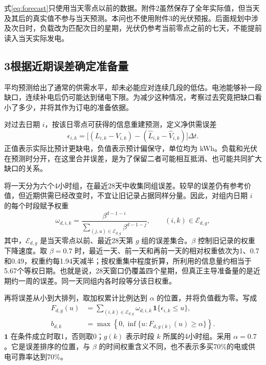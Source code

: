 \documentclass[11pt,a4paper]{article}
\begin{document}
式\eqref{eq:forecast}只使用当天零点以前的数据。附件2虽然保存了全年实际值，但当天及其后的真实值不参与当天预测。本问也不使用附件3的光伏预报。后面规划中涉及次日时，负载改为匹配次日的星期，光伏仍参考当前零点之前的七天，不能提前读入当天实际发电。

\subsection*{3\quad 根据近期误差确定准备量}

平均预测给出了通常的供需水平，却未必能应对连续几段的低估。电池能够补一段缺口，连续补电后仍可能达到储电下限。为减少这种情况，考察过去究竟把缺口看小了多少，并将其作为订电的准备依据。

对过去日期 $i$，按该日零点可获得的信息重建预测，定义净供需误差
\begin{equation}
\epsilon_{i,k}=\big[(L_{i,k}-V_{i,k})-(\widehat L_{i,k}-\widehat V_{i,k})\big]\Delta t.
\label{eq:error}
\end{equation}
正值表示实际比预计更缺电，负值表示预计偏保守，单位均为 kWh。负载和光伏在预测时分开，在这里合并误差，是为了保留二者可能相互抵消、也可能共同扩大缺口的关系。

将一天分为六个4小时组，在最近28天中收集同组误差。较早的误差仍有参考价值，但近期供需已经改变时，不宜让旧记录占据同样分量。因此，对组内日期 $i$ 的每个时段赋予权重
\begin{equation}
\omega_{d,i,k}=\frac{\beta^{d-1-i}}
{\displaystyle\sum_{(j,u)\in\mathcal E_{d,g}}\beta^{d-1-j}},\qquad (i,k)\in\mathcal E_{d,g},
\label{eq:weight}
\end{equation}
其中，$\mathcal E_{d,g}$ 是当天零点以前、最近28天第 $g$ 组的误差集合。$\beta$ 控制旧记录的权重下降速度。取 $\beta=0.7$ 时，最近一天、前一天和再前一天的相对权重依次为1、0.7和0.49，权重约每1.94天减半；按权重集中程度折算，所利用的信息量约相当于5.67个等权日期。也就是说，28天窗口仍覆盖四个星期，但真正主导准备量的是近期约一周的误差。同一天同组内各时段等分该日权重。

再将误差从小到大排列，取加权累计比例达到 $\alpha$ 的位置，并将负值截为零。写成
\begin{align}
F_{d,g}(u)&=\sum_{(i,k)\in\mathcal E_{d,g}}\omega_{d,i,k}\,\mathbf{1}\{\epsilon_{i,k}\le u\},\\
b_{d,k}&=\max\left\{0,\inf\{u:F_{d,g(k)}(u)\ge\alpha\}\right\}.
\label{eq:margin}
\end{align}
$\mathbf1$ 在条件成立时取1，否则取0；$g(k)$ 表示时段 $k$ 所属的4小时组。采用 $\alpha=0.7$。它是误差排序的位置，与 $\beta$ 的时间权重含义不同，也不表示多买70\%的电或供电可靠率达到70\%。
\end{document}
